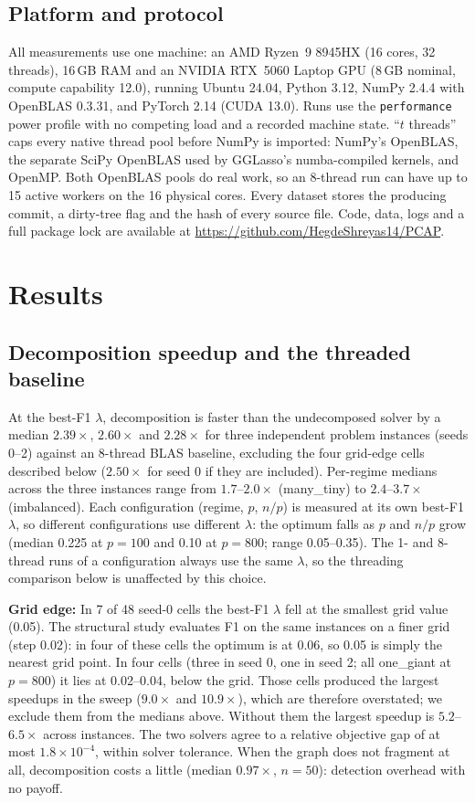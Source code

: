 \documentclass[conference]{IEEEtran}
\begin{document}
\subsection{Platform and protocol}
All measurements use one machine: an AMD Ryzen~9 8945HX (16 cores, 32
threads), 16\,GB RAM and an NVIDIA RTX~5060 Laptop GPU (8\,GB nominal,
compute capability 12.0), running Ubuntu 24.04, Python 3.12, NumPy 2.4.4 with
OpenBLAS 0.3.31, and PyTorch 2.14 (CUDA 13.0). Runs use the
\texttt{performance} power profile with no competing load and a recorded
machine state. ``$t$ threads'' caps every native thread pool before NumPy is
imported: NumPy's OpenBLAS, the separate SciPy OpenBLAS used by GGLasso's
numba-compiled kernels, and OpenMP. Both OpenBLAS pools do real work, so an
8-thread run can have up to 15 active workers on the 16 physical cores. Every dataset
stores the producing commit, a dirty-tree flag and the hash of every source
file. Code, data, logs and a full package lock are available at
\url{https://github.com/HegdeShreyas14/PCAP}.

\section{Results}

\subsection{Decomposition speedup and the threaded baseline}
\label{sec:speedup}
At the best-F1 $\lambda$, decomposition is faster than the undecomposed
solver by a median $2.39\times$, $2.60\times$ and $2.28\times$ for three
independent problem instances (seeds 0--2) against an 8-thread BLAS
baseline, excluding the four grid-edge cells described below ($2.50\times$
for seed 0 if they are included). Per-regime medians across the three instances range from
$1.7$--$2.0\times$ (many\_tiny) to $2.4$--$3.7\times$ (imbalanced). Each configuration (regime, $p$, $n/p$) is measured at its own best-F1
$\lambda$, so different configurations use different $\lambda$: the optimum
falls as $p$ and $n/p$ grow (median 0.225 at $p=100$ and 0.10 at $p=800$;
range 0.05--0.35). The 1- and 8-thread runs of a configuration always use
the same $\lambda$, so the threading comparison below is unaffected by this choice.

\textbf{Grid edge:} In 7 of 48 seed-0 cells the best-F1 $\lambda$ fell at the
smallest grid value (0.05). The structural study evaluates F1 on the same
instances on a finer grid (step 0.02): in four of these cells the optimum is
at 0.06, so 0.05 is simply the nearest grid point. In four cells (three in
seed 0, one in seed 2; all one\_giant at $p=800$) it lies at 0.02--0.04,
below the grid. Those cells produced the largest speedups in the sweep
($9.0\times$ and $10.9\times$), which are therefore overstated; we exclude
them from the medians above. Without them the largest speedup is
$5.2$--$6.5\times$ across instances. The two solvers agree to a relative objective gap
of at most $1.8\times10^{-4}$, within solver tolerance. When the graph does
not fragment at all, decomposition costs a little
(median $0.97\times$, $n=50$): detection overhead with no payoff.
\end{document}
